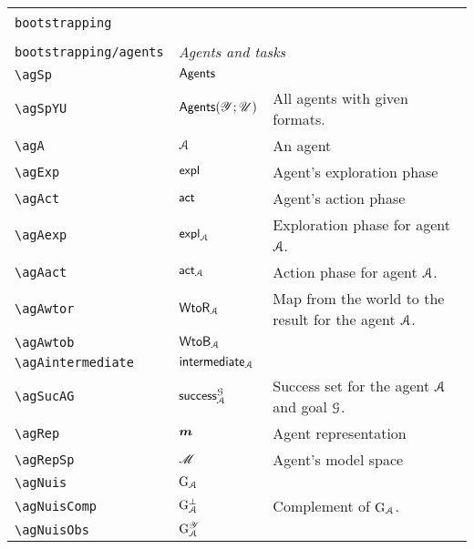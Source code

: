 \begin{longtable}{lll}
 &  & \\ 
 {\color[rgb]{0.5,0.5,0.5}\texttt{bootstrapping}} & \multicolumn{2}{l}{\emph{}}\\ 
 \hline
\hline
 &  & \\ 
 {\color[rgb]{0.5,0.5,0.5}\texttt{bootstrapping/agents}} & \multicolumn{2}{l}{\emph{Agents and tasks}}\\ 
 \hline
{\color[rgb]{0.5,0.5,0.5}\texttt{\textbackslash agSp}} & $\mathsf{Agents}$ &  \\ 
 {\color[rgb]{0.5,0.5,0.5}\texttt{\textbackslash agSpYU}} & $\mathsf{Agents}(\mathscr{Y};\mathscr{U})$ &  All agents with given formats.\\ 
 {\color[rgb]{0.5,0.5,0.5}\texttt{\textbackslash agA}} & $\mathcal{A}$ &  An agent\\ 
 {\color[rgb]{0.5,0.5,0.5}\texttt{\textbackslash agExp}} & $\mathsf{expl}$ &  Agent's exploration phase\\ 
 {\color[rgb]{0.5,0.5,0.5}\texttt{\textbackslash agAct}} & $\mathsf{act}$ &  Agent's action phase\\ 
 {\color[rgb]{0.5,0.5,0.5}\texttt{\textbackslash agAexp}} & $\mathsf{expl}_{\mathcal{A}}$ &  Exploration phase for agent $\mathcal{A}$.\\ 
 {\color[rgb]{0.5,0.5,0.5}\texttt{\textbackslash agAact}} & $\mathsf{act}_{\mathcal{A}}$ &   Action phase for agent $\mathcal{A}$.\\ 
 {\color[rgb]{0.5,0.5,0.5}\texttt{\textbackslash agAwtor}} & $\mathsf{WtoR}_{\mathcal{A}}$ &  Map from the world to the result for the agent $\mathcal{A}$.\\ 
 {\color[rgb]{0.5,0.5,0.5}\texttt{\textbackslash agAwtob}} & $\mathsf{WtoB}_{\mathcal{A}}$ &  \\ 
 {\color[rgb]{0.5,0.5,0.5}\texttt{\textbackslash agAintermediate}} & $\mathsf{intermediate}_{\mathcal{A}}$ & \\ 
 {\color[rgb]{0.5,0.5,0.5}\texttt{\textbackslash agSucAG}} & $\mathsf{success}^{\mathcal{G}}_{\mathcal{A}}$ &  Success set for the agent $\mathcal{A}$ and goal $\mathcal{G}$.\\ 
 {\color[rgb]{0.5,0.5,0.5}\texttt{\textbackslash agRep}} & $\boldsymbol{m}$ &  Agent representation\\ 
 {\color[rgb]{0.5,0.5,0.5}\texttt{\textbackslash agRepSp}} & $\mathscr{M}$ &  Agent's model space\\ 
 {\color[rgb]{0.5,0.5,0.5}\texttt{\textbackslash agNuis}} & $\mathrm{G}_{\mathcal{A}}$ & \\ 
 {\color[rgb]{0.5,0.5,0.5}\texttt{\textbackslash agNuisComp}} & $\mathrm{G}_{\mathcal{A}}^{\perp}$ &  Complement of $\mathrm{G}_{\mathcal{A}}$.\\ 
 {\color[rgb]{0.5,0.5,0.5}\texttt{\textbackslash agNuisObs}} & $\mathrm{G}_{\mathcal{A}}^{\mathscr{Y}}$ & \\ 

\end{longtable}
